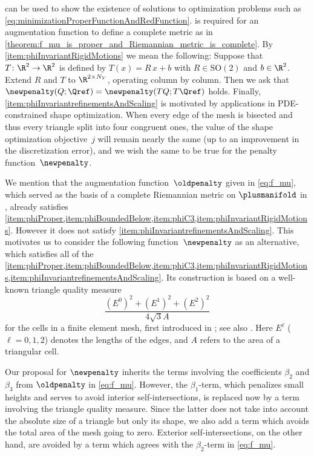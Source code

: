  can be used to show the existence of solutions to optimization problems such as \eqref{eq:minimizationProperFunctionAndRedFunction}.
 is required for an augmentation function to define a complete metric as in \cref{theorem:f_mu_is_proper_and_Riemannian_metric_is_complete}.
By \cref{item:phiInvariantRigidMotions} we mean the following:
Suppose that $T \colon \R^2 \to \R^2$ is defined by $T(x) = R \, x + b$ with $R \in \text{SO}(2)$ and $b \in \R^2$.
Extend $R$ and $T$ to $\R^{2 \times N_V}$, operating column by column.
Then we ask that $\newpenalty(Q;\Qref) = \newpenalty(T Q;T \Qref)$ holds.
Finally, \cref{item:phiInvariantrefinementsAndScaling} is motivated by applications in PDE-constrained shape optimization.
When every edge of the mesh is bisected and thus every triangle split into four congruent ones, the value of the shape optimization objective~$j$ will remain nearly the same (up to an improvement in the discretization error), and we wish the same to be true for the penalty function~$\newpenalty$.

We mention that the augmentation function~$\oldpenalty$ given in \eqref{eq:f_mu}, which served as the basis of a complete Riemannian metric on $\plusmanifold$ in \cite{HerzogLoayzaRomero:2022:1}, already satisfies \cref{item:phiProper,item:phiBoundedBelow,item:phiC3,item:phiInvariantRigidMotions}.
However it does not satisfy \cref{item:phiInvariantrefinementsAndScaling}.
This motivates us to consider the following function~$\newpenalty$ as an alternative, which satisfies all of the \cref{item:phiProper,item:phiBoundedBelow,item:phiC3,item:phiInvariantRigidMotions,item:phiInvariantrefinementsAndScaling}.
Its construction is based on a well-known triangle quality measure
\begin{equation}
	\label{eq:triangle_quality_measure}
	\frac{(E^0)^2 + (E^1)^2 + (E^2)^2}{4 \sqrt{3}A}
\end{equation}
for the cells in a finite element mesh, first introduced in \cite{BhatiaLawrence:1990:1}; see also \cite[Table~6, Row~4]{Shewchuk:2002:1}.
Here $E^\ell$ ($\ell = 0, 1, 2$) denotes the lengths of the edges, and $A$ refers to the area of a triangular cell.

Our proposal for $\newpenalty$ inherits the terms involving the coefficients $\beta_2$ and $\beta_3$ from $\oldpenalty$ in \eqref{eq:f_mu}.
	However, the $\beta_1$-term, which penalizes small heights and serves to avoid interior self-intersections, is replaced now by a term involving the triangle quality measure.
Since the latter does not take into account the absolute size of a triangle but only its shape, we also add a term which avoids the total area of the mesh going to zero.
Exterior self-intersections, on the other hand, are avoided by a term which agrees with the $\beta_2$-term in \eqref{eq:f_mu}.

